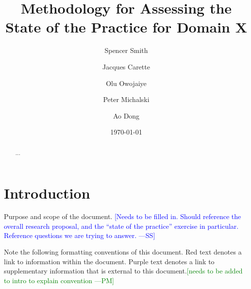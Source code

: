 \documentclass[letterpaper,cleveref]{lipics-v2019}
\title{Methodology for Assessing the State of the Practice for Domain X}
\author{Spencer Smith}{McMaster University, Canada}{smiths@mcmaster.ca}{}{}
\author{Jacques Carette}{McMaster University, Canada}{carette@mcmaster.ca}{}{}
\author{Olu Owojaiye}{McMaster University, Canada}{owojaiyo@mcmaster.ca}{}{}
\author{Peter Michalski}{McMaster University, Canada}{michap@mcmaster.ca}{}{}
\author{Ao Dong}{McMaster University, Canada}{donga9@mcmaster.ca}{}{}
\date{\today}
\newcommand{\authornote}[3]{\textcolor{#1}{[#3 ---#2]}}
\newcommand{\authornote}[3]{}
\newcommand{\wss}[1]{\authornote{blue}{SS}{#1}} %
\newcommand{\pmi}[1]{\authornote{green}{PM}{#1}} %
\theoremstyle{definition}
\begin{document}
\maketitle

\begin{abstract}
	...
\end{abstract}

\tableofcontents

\section{Introduction} \label{SecIntroduction}

Purpose and scope of the document.  \wss{Needs to be filled in.  Should
	reference the overall research proposal, and the ``state of the practice''
	exercise in particular.  Reference questions we are trying to answer.}

Note the following formatting conventions of this document. Red text denotes a link to information within the document. Purple text denotes a link to supplementary information that is external to this document.\pmi{needs to be added to intro to explain convention} 
\end{document}
